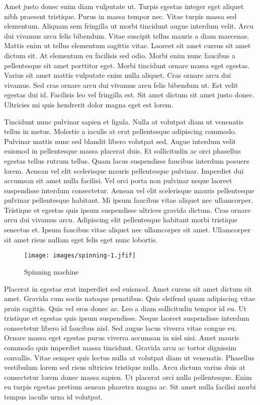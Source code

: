 \documentclass[
  letterpaper,
  DIV=11,
  numbers=noendperiod]{scrartcl}
\begin{document}
Amet justo donec enim diam vulputate ut. Turpis egestas integer eget
aliquet nibh praesent tristique. Purus in massa tempor nec. Vitae turpis
massa sed elementum. Aliquam sem fringilla ut morbi tincidunt augue
interdum velit. Arcu dui vivamus arcu felis bibendum. Vitae suscipit
tellus mauris a diam maecenas. Mattis enim ut tellus elementum sagittis
vitae. Laoreet sit amet cursus sit amet dictum sit. At elementum eu
facilisis sed odio. Morbi enim nunc faucibus a pellentesque sit amet
porttitor eget. Morbi tincidunt ornare massa eget egestas. Varius sit
amet mattis vulputate enim nulla aliquet. Cras ornare arcu dui vivamus.
Sed cras ornare arcu dui vivamus arcu felis bibendum ut. Est velit
egestas dui id. Facilisis leo vel fringilla est. Sit amet dictum sit
amet justo donec. Ultricies mi quis hendrerit dolor magna eget est
lorem.

Tincidunt nunc pulvinar sapien et ligula. Nulla at volutpat diam ut
venenatis tellus in metus. Molestie a iaculis at erat pellentesque
adipiscing commodo. Pulvinar mattis nunc sed blandit libero volutpat
sed. Augue interdum velit euismod in pellentesque massa placerat duis.
Et sollicitudin ac orci phasellus egestas tellus rutrum tellus. Quam
lacus suspendisse faucibus interdum posuere lorem. Aenean vel elit
scelerisque mauris pellentesque pulvinar. Imperdiet dui accumsan sit
amet nulla facilisi. Vel orci porta non pulvinar neque laoreet
suspendisse interdum consectetur. Aenean vel elit scelerisque mauris
pellentesque pulvinar pellentesque habitant. Mi ipsum faucibus vitae
aliquet nec ullamcorper. Tristique et egestas quis ipsum suspendisse
ultrices gravida dictum. Cras ornare arcu dui vivamus arcu. Adipiscing
elit pellentesque habitant morbi tristique senectus et. Ipsum faucibus
vitae aliquet nec ullamcorper sit amet. Ullamcorper sit amet risus
nullam eget felis eget nunc lobortis.

\begin{figure}

{\centering \texttt{[image: images/spinning-1.jfif]}

}

\caption{Spinning machine}

\end{figure}

Placerat in egestas erat imperdiet sed euismod. Amet cursus sit amet
dictum sit amet. Gravida cum sociis natoque penatibus. Quis eleifend
quam adipiscing vitae proin sagittis. Quis vel eros donec ac. Leo a diam
sollicitudin tempor id eu. Ut tristique et egestas quis ipsum
suspendisse. Neque laoreet suspendisse interdum consectetur libero id
faucibus nisl. Sed augue lacus viverra vitae congue eu. Ornare massa
eget egestas purus viverra accumsan in nisl nisi. Amet mauris commodo
quis imperdiet massa tincidunt. Gravida arcu ac tortor dignissim
convallis. Vitae semper quis lectus nulla at volutpat diam ut venenatis.
Phasellus vestibulum lorem sed risus ultricies tristique nulla. Arcu
dictum varius duis at consectetur lorem donec massa sapien. Ut placerat
orci nulla pellentesque. Enim eu turpis egestas pretium aenean pharetra
magna ac. Sit amet nulla facilisi morbi tempus iaculis urna id volutpat.
\end{document}
